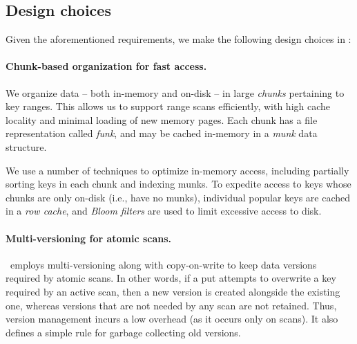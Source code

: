 
\subsection{Design choices}

Given the aforementioned requirements, we make the following design choices in \sys:

\paragraph{Chunk-based organization for fast access.}
We organize data --  both in-memory and on-disk --  in large \emph{chunks}  pertaining to  key ranges.  This allows us to support range scans efficiently, with  high cache locality and minimal loading of new memory pages. 
Each chunk has a file representation called  \emph{funk}, and may be cached in-memory in a  \emph{munk} data structure.

We use a number of techniques to optimize in-memory  access, including partially sorting keys in each chunk and 
indexing munks. 
To expedite access to  keys whose chunks are only on-disk  (i.e., have no munks), 
individual popular keys are cached in a \emph{row cache}, 
and \emph{Bloom filters} are used to limit excessive access to disk. 


\paragraph{Multi-versioning for atomic scans.} \sys\ employs multi-versioning along with
copy-on-write to keep data versions required by atomic scans. 
In other words, if a put attempts to overwrite a key  required by an active scan, then a new version is created alongside the 
existing one, whereas versions that are not needed by any scan are not retained. 
Thus, version management incurs a low overhead (as it occurs only on scans). It also defines a simple rule for garbage collecting old versions.
